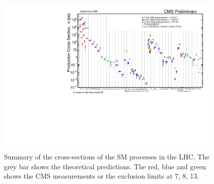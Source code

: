 \begin{figure}[ht]
    \centering
    \includegraphics[width=0.99\textwidth]{chapters/RelatedWorks/sectionPPCollision/figures/SigmaNew_v0.pdf}
    \caption{Summary of the cross-sections of the SM processes in the LHC. The grey bar shows the theoretical predictions. The red, blue and green shows the CMS measurements or the exclusion limits at 7, 8, 13\TeV.}
    \label{fig:relatedWorks:ppCollision:hardxs}
\end{figure}


